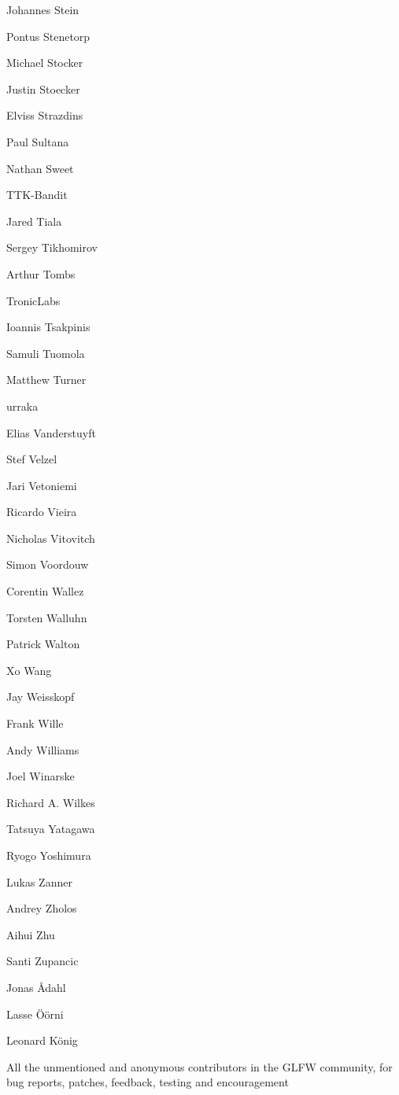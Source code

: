 \begin{DoxyItemize}
\item Johannes Stein
\item Pontus Stenetorp
\item Michael Stocker
\item Justin Stoecker
\item Elviss Strazdins
\item Paul Sultana
\item Nathan Sweet
\item TTK-\/\+Bandit
\item Jared Tiala
\item Sergey Tikhomirov
\item Arthur Tombs
\item Tronic\+Labs
\item Ioannis Tsakpinis
\item Samuli Tuomola
\item Matthew Turner
\item urraka
\item Elias Vanderstuyft
\item Stef Velzel
\item Jari Vetoniemi
\item Ricardo Vieira
\item Nicholas Vitovitch
\item Simon Voordouw
\item Corentin Wallez
\item Torsten Walluhn
\item Patrick Walton
\item Xo Wang
\item Jay Weisskopf
\item Frank Wille
\item Andy Williams
\item Joel Winarske
\item Richard A. Wilkes
\item Tatsuya Yatagawa
\item Ryogo Yoshimura
\item Lukas Zanner
\item Andrey Zholos
\item Aihui Zhu
\item Santi Zupancic
\item Jonas Ådahl
\item Lasse Öörni
\item Leonard König
\item All the unmentioned and anonymous contributors in the GLFW community, for bug reports, patches, feedback, testing and encouragement 
\end{DoxyItemize}